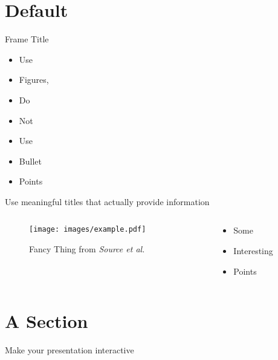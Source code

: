 \section{Default}

\begin{frame}{Frame Title}
    \begin{itemize}
        \item Use
        \item Figures,
        \item Do
        \item Not
        \item Use
        \item Bullet
        \item Points
    \end{itemize}
\end{frame}

\begin{frame}{Use meaningful titles that actually provide information}
    \begin{columns}
        \begin{column}{0.6\textwidth}
            \begin{figure}
                \centering
                \texttt{[image: images/example.pdf]}
                \caption{Fancy Thing from \textit{Source et al.}}
            \end{figure}
        \end{column}
        \begin{column}{0.4\textwidth}
            \begin{itemize}
                \item Some
                \item Interesting
                \item Points
            \end{itemize}
        \end{column}
    \end{columns}
\end{frame}

\section{A Section}

\begin{frame}{Make your presentation interactive}
    \begin{cublock}
        \begin{overlayarea}{\textwidth}{\baselineskip}
        \end{overlayarea}
    \end{cublock}
\end{frame}
